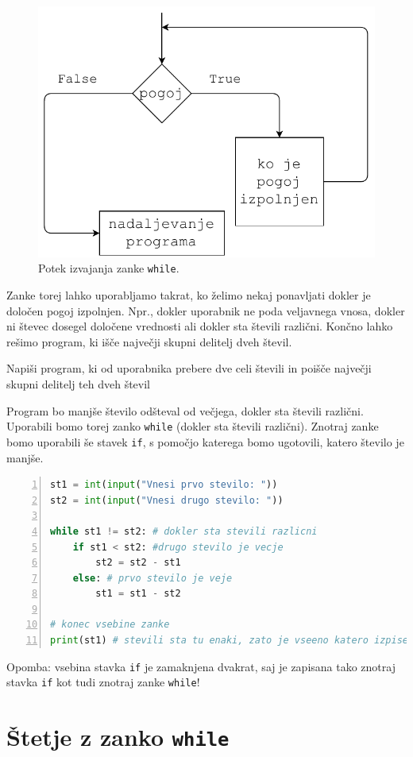 \begin{figure}
    \centering
    \includegraphics[width=0.5\linewidth]{img/while1.pdf}
    \caption{Potek izvajanja zanke \texttt{while}.}
    \label{img:while1}
\end{figure}

Zanke torej lahko uporabljamo takrat, ko želimo nekaj ponavljati dokler je določen pogoj izpolnjen. Npr., dokler uporabnik ne poda veljavnega vnosa, dokler ni števec dosegel določene vrednosti ali dokler sta števili različni. Končno lahko rešimo program, ki išče največji skupni delitelj dveh števil.
\begin{zgled}
Napiši program, ki od uporabnika prebere dve celi števili in poišče največji skupni delitelj teh dveh števil
\end{zgled}
\begin{resitev}
Program bo manjše število odšteval od večjega, dokler sta števili različni. Uporabili bomo torej zanko \texttt{while} (dokler sta števili različni).  Znotraj zanke bomo uporabili še stavek \texttt{if}, s pomočjo katerega bomo ugotovili, katero število je manjše. 
\begin{lstlisting}[language=Python,numbers=left]
st1 = int(input("Vnesi prvo stevilo: "))
st2 = int(input("Vnesi drugo stevilo: "))

while st1 != st2: # dokler sta stevili razlicni
    if st1 < st2: #drugo stevilo je vecje
        st2 = st2 - st1
    else: # prvo stevilo je veje
        st1 = st1 - st2

# konec vsebine zanke 
print(st1) # stevili sta tu enaki, zato je vseeno katero izpisem
\end{lstlisting}
Opomba: vsebina stavka \texttt{if} je zamaknjena dvakrat, saj je zapisana tako znotraj stavka \texttt{if} kot tudi znotraj zanke \texttt{while}!
\end{resitev}

\section{Štetje z zanko \texttt{while}}

